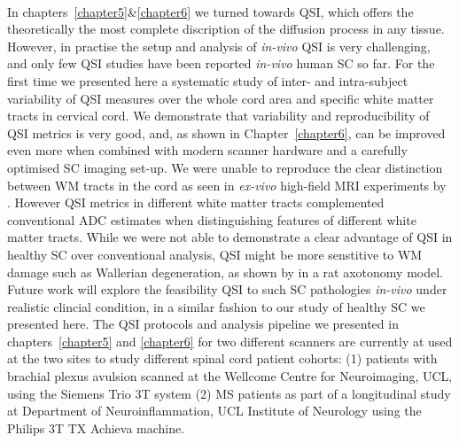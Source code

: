 \paragraph{}
In chapters~\ref{chapter5}\&\ref{chapter6} we turned towards \gls{QSI}, which offers the theoretically the most complete discription of the diffusion process in any tissue. However, in practise the setup and analysis of \emph{in-vivo} \gls{QSI} is very challenging, and only few \gls{QSI} studies have been reported \emph{in-vivo} human {\gls{SC}} so far. For the first time we presented here a systematic study of inter- and intra-subject variability of \gls{QSI} measures over the whole cord area and specific white matter tracts in cervical cord. We demonstrate that variability and reproducibility of \gls{QSI} metrics is very good, and, as shown in Chapter~\ref{chapter6}, can be improved even more when combined with modern scanner hardware and a carefully optimised \gls{SC} imaging set-up. We were unable to reproduce the clear distinction between WM tracts in the cord as seen in \emph{ex-vivo} high-field MRI experiments by \citet{Ong:2012}. However \gls{QSI} metrics in different white matter tracts complemented conventional \gls{ADC} estimates when distinguishing features of different white matter tracts. While we were not able to demonstrate a clear advantage of \gls{QSI} in healthy SC over conventional analysis, \gls{QSI} might be more senstitive to WM damage such as Wallerian degeneration, as shown by \citet{Farrell:2010} in a rat axotonomy model. Future work will explore the feasibility \gls{QSI} to such SC pathologies \emph{in-vivo} under realistic clincial condition, in a similar fashion to our study of healthy SC we presented here. The \gls{QSI} protocols and analysis pipeline we presented in chapters~\ref{chapter5} and \ref{chapter6} for two different scanners are currently at used at the two sites to study different spinal cord patient cohorts: (1) patients with brachial plexus avulsion scanned at the Wellcome Centre for Neuroimaging, UCL, using the Siemens Trio 3T system (2) \gls{MS} patients as part of a longitudinal study at Department of Neuroinflammation, UCL Institute of Neurology using the Philips 3T TX Achieva machine.

